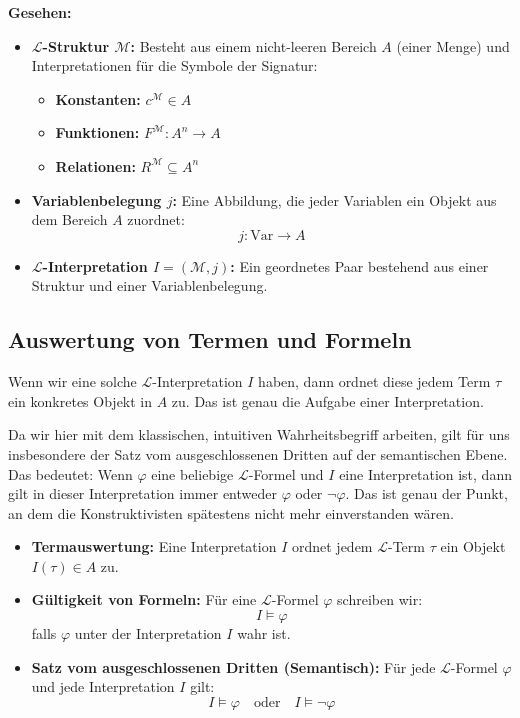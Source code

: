 \begin{math-stroke}
\textbf{Gesehen:}
\begin{itemize}
    \item \textbf{$\mathcal{L}$-Struktur $\mathcal{M}$:} Besteht aus einem nicht-leeren Bereich $A$ (einer Menge) und Interpretationen für die Symbole der Signatur:
    \begin{itemize}
        \item \textbf{Konstanten:} $c^{\mathcal{M}} \in A$
        \item \textbf{Funktionen:} $F^{\mathcal{M}} \colon A^n \to A$
        \item \textbf{Relationen:} $R^{\mathcal{M}} \subseteq A^n$
    \end{itemize}
    \item \textbf{Variablenbelegung $j$:} Eine Abbildung, die jeder Variablen ein Objekt aus dem Bereich $A$ zuordnet:
    \[ j \colon \text{Var} \to A \]
    \item \textbf{$\mathcal{L}$-Interpretation $I = (\mathcal{M}, j)$:} Ein geordnetes Paar bestehend aus einer Struktur und einer Variablenbelegung.
\end{itemize}
\end{math-stroke}

\subsection{Auswertung von Termen und Formeln}
\begin{spoken-clean}[00:07:47 - 00:09:40]
Wenn wir eine solche $\mathcal{L}$-Interpretation $I$ haben, dann ordnet diese jedem Term $\tau$ ein konkretes Objekt in $A$ zu. Das ist genau die Aufgabe einer Interpretation.

Da wir hier mit dem klassischen, intuitiven Wahrheitsbegriff arbeiten, gilt für uns insbesondere der Satz vom ausgeschlossenen Dritten auf der semantischen Ebene. Das bedeutet: Wenn $\varphi$ eine beliebige $\mathcal{L}$-Formel und $I$ eine Interpretation ist, dann gilt in dieser Interpretation immer entweder $\varphi$ oder $\neg\varphi$. Das ist genau der Punkt, an dem die Konstruktivisten spätestens nicht mehr einverstanden wären.
\end{spoken-clean}

\begin{math-stroke}
\begin{itemize}
    \item \textbf{Termauswertung:} Eine Interpretation $I$ ordnet jedem $\mathcal{L}$-Term $\tau$ ein Objekt $I(\tau) \in A$ zu.
    \item \textbf{Gültigkeit von Formeln:} Für eine $\mathcal{L}$-Formel $\varphi$ schreiben wir:
    \[ I \models \varphi \]
    falls $\varphi$ unter der Interpretation $I$ wahr ist.
    \item \textbf{Satz vom ausgeschlossenen Dritten (Semantisch):} Für jede $\mathcal{L}$-Formel $\varphi$ und jede Interpretation $I$ gilt:
    \[ I \models \varphi \quad \text{oder} \quad I \models \neg \varphi \]
\end{itemize}
\end{math-stroke}


